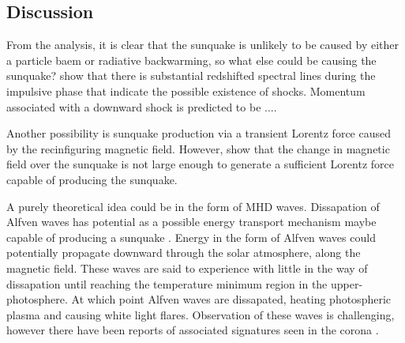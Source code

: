 \subsection{Discussion}
From the analysis, it is clear that the sunquake is unlikely to be caused by either a particle baem or radiative backwarming, so what else could be causing the sunquake? \cite{2015ApJ...812...35M} show that there is substantial redshifted spectral lines during the impulsive phase that indicate the possible existence of shocks. Momentum associated with a downward shock is predicted to be ....

Another possibility is sunquake production via a transient Lorentz force caused by the recinfiguring magnetic field. However, \cite{2014ApJ...796...85J} show that the change in magnetic field over the sunquake is not large enough to generate a sufficient Lorentz force capable of producing the sunquake.

A purely theoretical idea could be in the form of MHD waves. Dissapation of Alfven waves \citep{1982SoPh...80...99E} has potential as a possible energy transport mechanism maybe capable of producing a sunquake \citep{2015ApJ...812...35M}. Energy in the form of Alfven waves could potentially propagate downward through the solar atmosphere, along the magnetic field. These waves are said to experience with little in the way of dissapation until reaching the temperature minimum region in the upper-photosphere. At which point Alfven waves are dissapated, heating photospheric plasma and causing white light flares. Observation of these waves is challenging, however there have been reports of associated signatures seen in the corona \citep{2009A&A...501L..15B}. 


